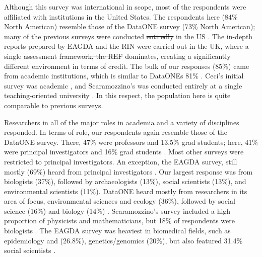 \documentclass[10pt]{article}
\providecommand{\DIFaddtex}[1]{{\protect\color{blue}\uwave{#1}}} %
\providecommand{\DIFdeltex}[1]{{\protect\color{red}\sout{#1}}}                      %
\providecommand{\DIFaddbegin}{} %
\providecommand{\DIFaddend}{} %
\providecommand{\DIFdelbegin}{} %
\providecommand{\DIFdelend}{} %
\providecommand{\DIFadd}[1]{\texorpdfstring{\DIFaddtex{#1}}{#1}} %
\providecommand{\DIFdel}[1]{\texorpdfstring{\DIFdeltex{#1}}{}} %
\begin{document}
Although this survey was international in scope, most of the respondents were affiliated with institutions in the United States.
The respondents here (84\% North American) resemble those of the DataONE survey \cite{tenopir_data_2011} (73\% North American); many of the previous surveys were conducted \DIFdelbegin \DIFdel{entiredly }\DIFdelend \DIFaddbegin \DIFadd{entirely }\DIFaddend in the US \cite{ceci_scientists_1988, kim_institutional_2012, scaramozzino_study_2012}.
The in-depth reports prepared by EAGDA \cite{bobrow_establishing_2014} and the RIN \cite{swan_share_2008} were carried out in the UK, where a single assessment \DIFdelbegin \DIFdel{framework, the REF }\DIFdelend \DIFaddbegin \DIFadd{framework-- the REF-- }\DIFaddend dominates, creating a significantly different environment in terms of credit.
The bulk of our responses (85\%) came from academic institutions, which is similar to DataONEs 81\% \cite{tenopir_data_2011}.  
Ceci's initial survey was academic \cite{ceci_scientists_1988}, and Scaramozzino's was conducted entirely at a single teaching-oriented university \cite{scaramozzino_study_2012}.
In this respect, the population here is quite comparable to previous surveys.

Researchers in all of the major roles in academia and a variety of disciplines responded.
In terms of role, our respondents again resemble those of the DataONE survey.
There, 47\% were professors and 13.5\% grad students; here, 41\% were principal investigators and 16\% grad students \cite{tenopir_data_2011}.
Most other surveys were restricted to principal investigators.
An exception, the EAGDA survey, still mostly (69\%) heard from principal investigators \cite{bobrow_establishing_2014}.
Our largest response was from biologists (37\%), followed by archaeologists (13\%), social scientists (13\%), and environmental scientists (11\%). 
DataONE heard mostly from researchers in its area of focus, environmental sciences and ecology (36\%), followed by social science (16\%) and biology (14\%) \cite{tenopir_data_2011}. 
Scaramozzino's survey included a high proportion of physicists and mathematicians, but 18\% of respondents were biologists \cite{scaramozzino_study_2012}.
The EAGDA survey was heaviest in biomedical fields, such as epidemiology and (26.8\%), genetics/genomics (20\%), but also featured 31.4\% social scientists \cite{bobrow_establishing_2014}. 
\DIFaddbegin 
\end{document}
